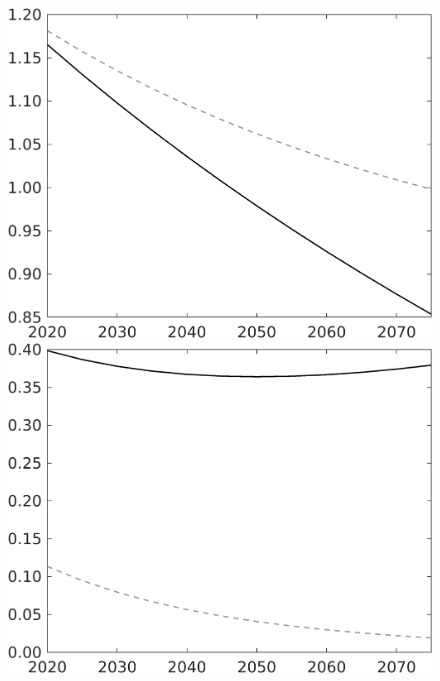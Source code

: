 \documentclass[12pt]{article}
\begin{document}
\begin{figure}[h!!]
\begin{minipage}[]{0.32\textwidth}
	\end{minipage}
	\begin{minipage}[]{0.32\textwidth}
		\includegraphics[width=1\textwidth]{../../codding_model/own_basedOnFried/optimalPol_010922_revision/figures/all_13Sept22/LevTaufNoTauf_TaulCalib_regime0_pg_spillover0_nsk0_xgr0_knspil1_sep1_LFlimit0_emsbase0_countec0_GovRev0_etaa0.79_lgd0.png}
	\end{minipage}	
	\begin{minipage}[]{0.32\textwidth}
		\includegraphics[width=1\textwidth]{../../codding_model/own_basedOnFried/optimalPol_010922_revision/figures/all_13Sept22/LevTaufNoTauf_TaulCalib_regime0_GFF_spillover0_nsk0_xgr0_knspil1_sep1_LFlimit0_emsbase0_countec0_GovRev0_etaa0.79_lgd0.png}

\end{minipage}
\end{figure}
\end{document}
